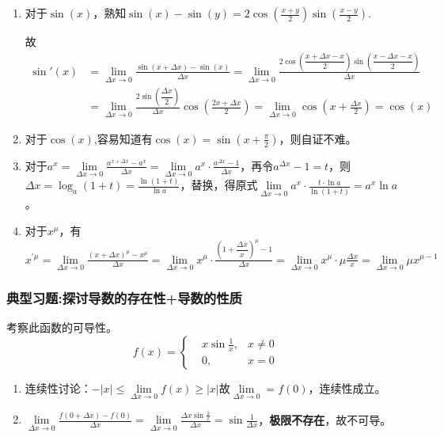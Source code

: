 \begin{enumerate}
	\item 对于$\sin(x)$，熟知$\sin(x)-\sin(y)=2\cos(\frac{x+y}{2})\sin(\frac{x-y}{2})$. 
	
	故
	\begin{align*}
		\sin'(x)&=\underset{\Delta x\rightarrow 0}{\lim}\frac{\sin(x+\Delta x)-\sin(x)}{\Delta x}=\underset{\Delta x\rightarrow 0}{\lim}\frac{2\cos(\dfrac{x+\Delta x-x}{2})\sin(\dfrac{x-\Delta x-x}{2})}{\Delta x}\\
		&=\underset{\Delta x\rightarrow 0}{\lim}\frac{2\sin(\dfrac{\Delta x}{2})}{\Delta x}\cos(\frac{2x+\Delta x}{2})=\underset{\Delta x\rightarrow 0}{\lim}\cos(x+\frac{\Delta x}{2})=\cos(x)
	\end{align*}
    \item 对于$\cos(x)$,容易知道有$\cos(x)=\sin(x+\frac{\pi}{2})$，则自证不难。
    \item 对于$a^x=\underset{\Delta x\rightarrow 0}{\lim}\frac{a^{x+\Delta x}-a^x}{\Delta x}=\underset{\Delta x\rightarrow 0}{\lim}a^x\cdot\frac{a^{\Delta x}-1}{\Delta x}$，再令$a^{\Delta x}-1=t$，则$\Delta x=\log_a(1+t)=\frac{\ln(1+t)}{\ln a}$，替换，得原式$\underset{\Delta x\rightarrow 0}{\lim}a^x\cdot\frac{t\cdot \ln a}{\ln(1+t)}=a^x\ln a$。
    \item 对于$x^{\mu}$，有$x^{'\mu}=\underset{\Delta x\rightarrow 0}{\lim}\frac{(x+\Delta x)^{\mu}-x^{\mu}}{\Delta x}=\underset{\Delta x\rightarrow 0}{\lim}x^{\mu}\cdot \frac{(1+\dfrac{\Delta x}{x})^{\mu}-1}{\Delta x}=\underset{\Delta x\rightarrow 0}{\lim}x^{\mu}\cdot\mu\frac{\Delta x}{x}=\underset{\Delta x\rightarrow 0}{\lim}\mu x^{\mu-1}$
\end{enumerate}

\subsubsection{典型习题:探讨导数的存在性+导数的性质}\label{sec:1.1.4.2}

\begin{example}
	考察此函数的可导性。 
	$$ f(x)=\left\{
	\begin{aligned}
		&x \sin\frac{1}{x},&x\neq 0\\
		&0,&x=0
	\end{aligned}
	\right.
	$$
	\begin{enumerate}[label=(\arabic*)]
		\item 连续性讨论：$-|x|\le\underset{\Delta x\rightarrow 0}{\lim}f(x)\ge|x|\mbox{故}\underset{\Delta x\rightarrow 0}{\lim}=f(0)$，连续性成立。
		\item $\underset{\Delta x\rightarrow 0}{\lim}\frac{f(0+\Delta x)-f(0)}{\Delta x}=\underset{\Delta x\rightarrow 0}{\lim}\frac{\Delta x\sin\frac{1}{x}}{\Delta x}=\sin\frac{1}{\Delta x}$，\textbf{极限不存在}，故不可导。
	\end{enumerate}
\end{example}\label{exa:}

